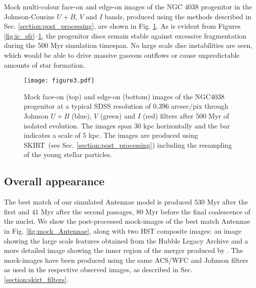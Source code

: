 \documentclass[a4paper,fleqn,usenatbib]{mnras}
\newcommand{\skirt}{\textsc{SKIRT}}
\begin{document}
Mock multi-colour face-on and edge-on images of the NGC 4038 progenitor in the Johnson-Cousins $U+B$, $V$ and 
$I$ bands, produced using the methods described in Sec. \ref{section:post_processing}, are shown 
in Fig. \ref{fig:NGC4038_progenitor}.
As is evident from Figures \ref{fig:ic_sfr}--\ref{fig:NGC4038_progenitor}, 
the progenitor discs remain stable against excessive fragmentation during the $500$ Myr simulation timespan. 
No large scale disc instabilities are seen, which would be able to drive massive gaseous outflows
or cause unpredictable amounts of star formation.

\begin{figure}
\texttt{[image: figure3.pdf]}
\caption{Mock face-on (top) and edge-on (bottom) images of the 
NGC4038 progenitor at a typical SDSS resolution of $0.396$ arcsec$/$pix through Johnson $U+B$ (blue), 
$V$ (green) and $I$ (red) filters after $500$ Myr of isolated evolution. 
The images span $30$ kpc horizontally and the bar indicates a scale of $5$ kpc. The images are produced using \skirt\ (see Sec. 
\ref{section:post_processing}) including the resampling of the young stellar particles.}
\label{fig:NGC4038_progenitor}
\end{figure}



\subsection{Overall appearance}\label{section:overall_appearance}


The best match of our simulated Antennae 
model is produced $530$ Myr after the first and $41$ Myr after the second 
passages, $80$ Myr before the final coalescence of the nuclei.
We show the post-processed mock-images of the best match Antennae
in Fig. \ref{fig:mock_Antennae}, along with two
HST composite images: an image showing the large scale features 
obtained from the Hubble Legacy Archive and a more detailed image showing
the inner region of the merger produced by 
\citet{1999AJ....118.1551W}. The mock-images have been produced using the same ACS/WFC and Johnson 
filters as used in the respective observed images, as described in Sec. \ref{section:skirt_filters}.
\end{document}
